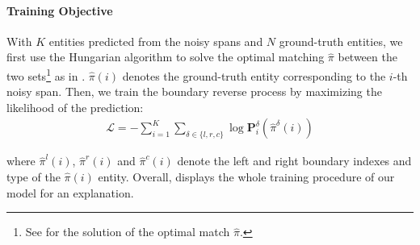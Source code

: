 \documentclass[11pt]{article}
\begin{document}
\paragraph{Training Objective} 
With $K$ entities predicted from the noisy spans and $N$ ground-truth entities, we first use the Hungarian algorithm \citep{kuhn1955hungarian} to solve the optimal matching $\hat{\pi}$ between the two sets\footnote{\;See  for the solution of the optimal match $\hat{\pi}$.} as in \citet{detr}. $\hat{\pi}(i)$ denotes the ground-truth entity corresponding to the $i$-th noisy span. Then, we train the boundary reverse process by maximizing the likelihood of the prediction:
\begin{align*}
\mathcal{L}=-\sum_{i=1}^K\sum_{\delta \in\{l, r, c\}} \log \mathbf{P}_i^{\delta}\left(\hat{\pi}^\delta(i)\right)
\end{align*}

\noindent where $\hat{\pi}^l(i)$, $\hat{\pi}^r(i)$ and $\hat{\pi}^c(i)$ denote the left and right boundary indexes and type of the $\hat{\pi}(i)$ entity. Overall,  displays the whole training procedure of our model for an explanation.
\end{document}
